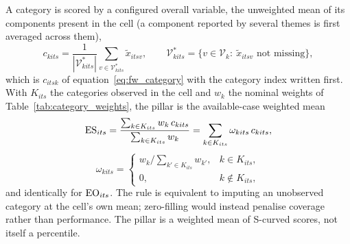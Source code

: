 A category is scored by a configured overall variable, the unweighted mean of its components
present in the cell (a component reported by several themes is first averaged across them),
\begin{equation}\label{eq:overall}
  c_{kits}=\frac{1}{|\mathcal V^{*}_{kits}|}\sum_{v\in\mathcal V^{*}_{kits}}\tilde x_{itsv},
  \qquad
  \mathcal V^{*}_{kits}=\{v\in\mathcal V_{k}:\ \tilde x_{itsv}\text{ not missing}\},
\end{equation}
which is $c_{itsk}$ of equation~\eqref{eq:fw_category} with the category index written first. With
$K_{its}$ the categories observed in the cell and $w_k$ the nominal weights of
Table~\ref{tab:category_weights}, the pillar is the available-case weighted mean
\begin{equation}\label{eq:pillar}
  \mathrm{ES}_{its}=\frac{\sum_{k\in K_{its}}w_k\,c_{kits}}{\sum_{k\in K_{its}}w_k}
  =\sum_{k\in K_{its}}\omega_{kits}\,c_{kits},
\end{equation}
\begin{equation}\label{eq:effective_weight}
  \omega_{kits}=\begin{cases}
    w_k\big/\sum_{k'\in K_{its}}w_{k'}, & k\in K_{its},\\
    0, & k\notin K_{its},
  \end{cases}
\end{equation}
and identically for $\mathrm{EO}_{its}$. The rule is equivalent to imputing an unobserved category at the
cell's own mean; zero-filling would instead penalise coverage rather than performance. The pillar
is a weighted mean of S-curved scores, not itself a percentile.

